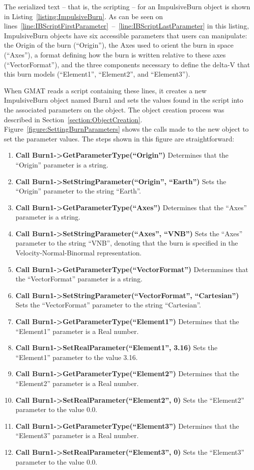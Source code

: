 The serialized text -- that is, the scripting -- for an ImpulsiveBurn object is shown in
Listing~\ref{listing:ImpulsiveBurn}.  As can be seen on
lines~\ref{line:IBScriptFirstParameter}~--~\ref{line:IBScriptLastParameter} in this listing,
ImpulsiveBurn objects have six accessible parameters that users can manipulate: the Origin of the
burn (``Origin''), the Axes used to orient the burn in space (``Axes''), a format defining how the
burn is written relative to these axes (``VectorFormat''), and the three components necessary to
define the delta-V that this burn models (``Element1'', ``Element2'', and ``Element3'').

When GMAT reads a script containing these lines, it creates a new ImpulsiveBurn object named Burn1
and sets the values found in the script into the associated parameters on the object.  The object
creation process was described in Section~\ref{section:ObjectCreation}. 
Figure~\ref{figure:SettingBurnParameters} shows the calls made to the new object to set the
parameter values.  The steps shown in this figure are straightforward:

\begin{enumerate}
\item \textbf{Call Burn1->GetParameterType(``Origin'')} Determines that the ``Origin'' parameter
is a string.
\item \textbf{Call Burn1->SetStringParameter(``Origin'', ``Earth'')} Sets the ``Origin''
parameter to the string ``Earth''.
\item \textbf{Call Burn1->GetParameterType(``Axes'')} Determines that the ``Axes'' parameter
is a string.
\item \textbf{Call Burn1->SetStringParameter(``Axes'', ``VNB'')} Sets the ``Axes''
parameter to the string ``VNB'', denoting that the burn is specified in the
Velocity-Normal-Binormal representation.
\item \textbf{Call Burn1->GetParameterType(``VectorFormat'')} Determmines that the ``VectorFormat''
parameter is a string.
\item \textbf{Call Burn1->SetStringParameter(``VectorFormat'', ``Cartesian'')} Sets the
``VectorFormat'' parameter to the string ``Cartesian''.
\item \textbf{Call Burn1->GetParameterType(``Element1'')} Determines that the ``Element1'' parameter
is a Real number.
\item \textbf{Call Burn1->SetRealParameter(``Element1'', 3.16)} Sets the ``Element1''
parameter to the value 3.16.
\item \textbf{Call Burn1->GetParameterType(``Element2'')} Determines that the ``Element2'' parameter
is a Real number.
\item \textbf{Call Burn1->SetRealParameter(``Element2'', 0)} Sets the ``Element2''
parameter to the value 0.0.
\item \textbf{Call Burn1->GetParameterType(``Element3'')} Determines that the ``Element3'' parameter
is a Real number.
\item \textbf{Call Burn1->SetRealParameter(``Element3'', 0)} Sets the ``Element3''
parameter to the value 0.0.
\end{enumerate}

